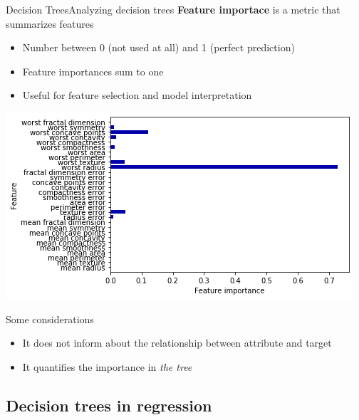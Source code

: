 \documentclass[10pt,compress]{beamer} %
\begin{document}
\begin{frame}{Decision Trees}{Analyzing decision trees}
    \textbf{Feature importace} is a metric that summarizes features
    \begin{itemize}
        \item Number between 0 (not used at all) and 1 (perfect prediction)
        \item Feature importances sum to one
        \item Useful for feature selection and model interpretation
    \end{itemize}

   \centering \includegraphics[width=0.5\linewidth]{figs/tree-importance.png}

   \flushleft

   \vspace{-0.5cm}

   Some considerations
   \begin{itemize}
       \item It does not inform about the relationship between attribute and target
       \item It quantifies the importance in \textit{the tree}
   \end{itemize}

\end{frame}

\subsection{Decision trees in regression}
\end{document}
